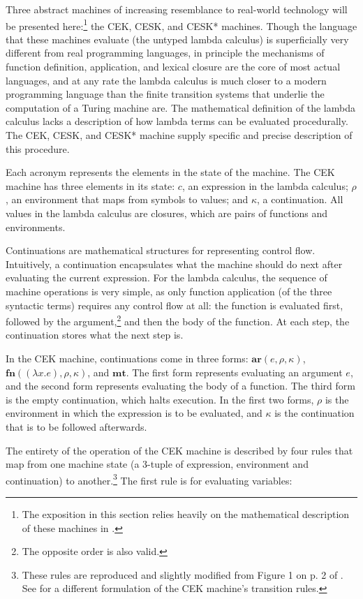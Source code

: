 \documentclass{article}
\begin{document}
Three abstract machines of increasing resemblance to real-world technology will be presented here:\footnote{The exposition in this section relies heavily on the mathematical description of these machines in \cite{aam}.} the CEK, CESK, and CESK* machines. Though the language that these machines evaluate (the untyped lambda calculus) is superficially very different from real programming languages, in principle the mechanisms of function definition, application, and lexical closure are the core of most actual languages, and at any rate the lambda calculus is much closer to a modern programming language than the finite transition systems that underlie the computation of a Turing machine are. The mathematical definition of the lambda calculus lacks a description of how lambda terms can be evaluated procedurally. The CEK, CESK, and CESK* machine supply specific and precise description of this procedure.

Each acronym represents the elements in the state of the machine. The CEK machine has three elements in its state: $c$, an expression in the lambda calculus; $\rho$, an environment that maps from symbols to values; and $\kappa$, a continuation. All values in the lambda calculus are closures, which are pairs of functions and environments.

Continuations are mathematical structures for representing control flow. Intuitively, a continuation encapsulates what the machine should do next after evaluating the current expression. For the lambda calculus, the sequence of machine operations is very simple, as only function application (of the three syntactic terms) requires any control flow at all: the function is evaluated first, followed by the argument,\footnote{The opposite order is also valid.} and then the body of the function. At each step, the continuation stores what the next step is.

In the CEK machine, continuations come in three forms: $\textbf{ar}(e, \rho, \kappa)$, $\textbf{fn}((\lambda x.e), \rho, \kappa)$, and $\textbf{mt}$. The first form represents evaluating an argument $e$, and the second form represents evaluating the body of a function. The third form is the empty continuation, which halts execution. In the first two forms, $\rho$ is the environment in which the expression is to be evaluated, and $\kappa$ is the continuation that is to be followed afterwards.

The entirety of the operation of the CEK machine is described by four rules that map from one machine state (a 3-tuple of expression, environment and continuation) to another.\footnote{These rules are reproduced and slightly modified from Figure 1 on p. 2 of \cite{aam}. See \cite{cek} for a different formulation of the CEK machine's transition rules.} The first rule is for evaluating variables:
\end{document}
